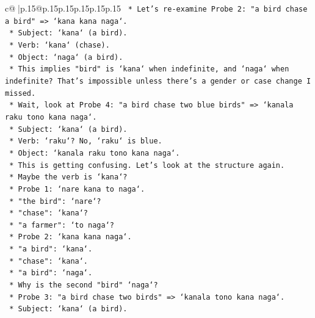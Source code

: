 \documentclass{article}
\begin{document}
{\begin{supertabular}{c@{$\;$}|p{.15\linewidth}@{}p{.15\linewidth}p{.15\linewidth}p{.15\linewidth}p{.15\linewidth}p{.15\linewidth}}
{{{\texttt{                    *   Let's re{-}examine Probe 2: "a bird chase a bird" => `kana kana naga`.} \\
\texttt{                        *   Subject: `kana` (a bird).} \\
\texttt{                        *   Verb: `kana` (chase).} \\
\texttt{                        *   Object: `naga` (a bird).} \\
\texttt{                        *   This implies "bird" is `kana` when indefinite, and `naga` when indefinite? That's impossible unless there's a gender or case change I missed.} \\
\texttt{                        *   Wait, look at Probe 4: "a bird chase two blue birds" => `kanala raku tono kana naga`.} \\
\texttt{                            *   Subject: `kana` (a bird).} \\
\texttt{                            *   Verb: `raku`? No, `raku` is blue.} \\
\texttt{                            *   Object: `kanala raku tono kana naga`.} \\
\texttt{                            *   This is getting confusing. Let's look at the structure again.} \\
\texttt{                            *   Maybe the verb is `kana`?} \\
\texttt{                            *   Probe 1: `nare kana to naga`.} \\
\texttt{                                *   "the bird": `nare`?} \\
\texttt{                                *   "chase": `kana`?} \\
\texttt{                                *   "a farmer": `to naga`?} \\
\texttt{                            *   Probe 2: `kana kana naga`.} \\
\texttt{                                *   "a bird": `kana`.} \\
\texttt{                                *   "chase": `kana`.} \\
\texttt{                                *   "a bird": `naga`.} \\
\texttt{                                *   Why is the second "bird" `naga`?} \\
\texttt{                            *   Probe 3: "a bird chase two birds" => `kanala tono kana naga`.} \\
\texttt{                                *   Subject: `kana` (a bird).} \\
}}}
\end{supertabular}}
\end{document}
